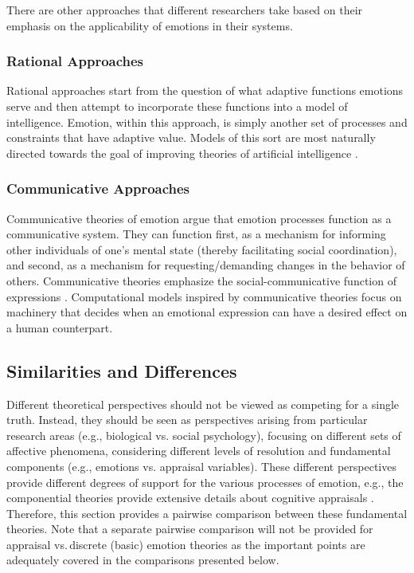 \documentclass[12pt]{report}
\begin{document}

There are other approaches that different researchers take based on their
emphasis on the applicability of emotions in their systems.

\subsubsection{Rational Approaches}

Rational approaches start from the question of what adaptive functions emotions
serve and then attempt to incorporate these functions into a model of
intelligence. Emotion, within this approach, is simply another set of processes
and constraints that have adaptive value. Models of this sort are most naturally
directed towards the goal of improving theories of artificial intelligence
\cite{anderson:newell-cognition} \cite{scheutz:affect-agent}
\cite{simon:motivation-emotion-cognition}.

\subsubsection{Communicative Approaches}

Communicative theories of emotion argue that emotion processes function as a
communicative system. They can function first, as a mechanism for informing
other individuals of one's mental state (thereby facilitating social
coordination), and second, as a mechanism for requesting/demanding changes in
the behavior of others. Communicative theories emphasize the
social-communicative function of expressions \cite{gratch:emotion-intention}.
Computational models inspired by communicative theories focus on machinery that
decides when an emotional expression can have a desired effect on a human
counterpart.

\subsection{Similarities and Differences}
\label{sec:comparison}

Different theoretical perspectives should not be viewed as competing for a
single truth. Instead, they should be seen as perspectives arising from
particular research areas (e.g., biological vs. social psychology), focusing on
different sets of affective phenomena, considering different levels of
resolution and fundamental components (e.g., emotions vs. appraisal variables).
These different perspectives provide different degrees of support for the
various processes of emotion, e.g., the componential theories provide extensive
details about cognitive appraisals \cite{hudlicka:guidelines-emotions}.
Therefore, this section provides a pairwise comparison between these fundamental
theories. Note that a separate pairwise comparison will not be provided for
appraisal vs.\,discrete (basic) emotion theories as the important points are
adequately covered in the comparisons presented below.
\end{document}
